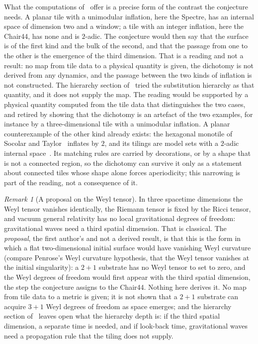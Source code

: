 \documentclass[11pt]{article}
\theoremstyle{definition}
\theoremstyle{remark}
\newtheorem{remark}{Remark}
\begin{document}
What the computations of~\cite{HartshornRomanov} offer is a precise form of the contrast the conjecture needs.  A planar tile with a unimodular
inflation, here the Spectre, has an internal space of dimension two and a window; a tile with an integer inflation, here the
Chair44, has none and is $2$-adic.  The conjecture would then say that the surface is of the first kind and the bulk of the
second, and that the passage from one to the other is the emergence of the third dimension.  That is a reading and not a
result: no map from tile data to a physical quantity is given, the dichotomy is not derived from any dynamics, and the
passage between the two kinds of inflation is not constructed.  The hierarchy section of~\cite{HartshornRomanov} tried the substitution hierarchy as that quantity, and it does not
supply the map.  The reading would
be supported by a physical quantity computed from the tile data that distinguishes the two cases, and retired by showing
that the dichotomy is an artefact of the two examples, for instance by a three-dimensional tile with a unimodular
inflation.  A planar counterexample of the other kind already exists: the hexagonal monotile of Socolar and
Taylor~\cite{SocolarTaylor} inflates by $2$, and its tilings are model sets with a $2$-adic internal
space~\cite{LeeMoodyTS}.  Its matching rules are carried by decorations, or by a shape that is not a connected region, so
the dichotomy can survive it only as a statement about connected tiles whose shape alone forces aperiodicity; this
narrowing is part of the reading, not a consequence of it.

\begin{remark}[A proposal on the Weyl tensor]
\label{rem:weyl}
In three spacetime dimensions the Weyl tensor vanishes identically, the Riemann tensor is fixed by the Ricci tensor, and
vacuum general relativity has no local gravitational degrees of freedom: gravitational waves need a third spatial
dimension.  That is classical.  The \emph{proposal}, the first author's and not a derived result, is that this is the form in which
a flat two-dimensional initial surface would have vanishing Weyl curvature (compare Penrose's Weyl curvature hypothesis, that
the Weyl tensor vanishes at the initial singularity): a $2{+}1$ substrate has no Weyl tensor to set to zero, and the Weyl
degrees of freedom would first appear with the third spatial dimension, the step the conjecture assigns to the Chair44.
Nothing here derives it.  No map from tile data to a metric is given; it is not shown that a $2{+}1$ substrate can acquire
$3{+}1$ Weyl degrees of freedom as space emerges; and the hierarchy section of~\cite{HartshornRomanov} leaves open what
the hierarchy depth is: if the
third spatial dimension, a separate time is needed, and if look-back time, gravitational waves need a propagation rule that
the tiling does not supply.
\end{remark}
\end{document}
